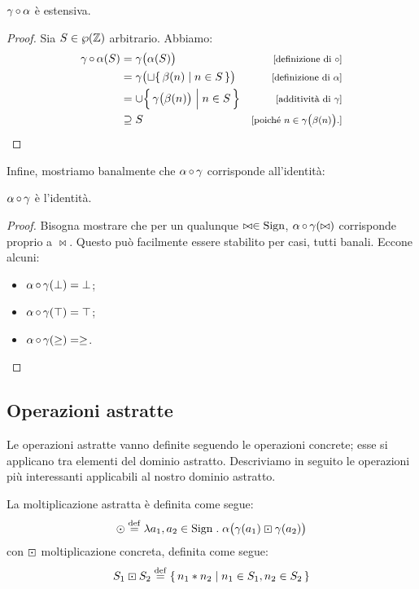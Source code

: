\begin{proposizione}
$\mathrm{\gamma}\mathop{\circ}\mathrm{\alpha}$ è estensiva.
\end{proposizione}
\begin{proof}
Sia $S \in \wp(\mathbb{Z})$ arbitrario.
Abbiamo:
\begin{align*}
  \compfun{\gamma}{\alpha}(S)
    &= \gamma\bigl(\alpha(S)\bigr)
    &\law{definizione di $\circ$} \\
    &= \gamma\bigl(\sqcup \{\, \beta(n) \mid n \in S \,\} \bigr)
    &\law{definizione di $\alpha$} \\
    &= \union \Bigl\{\, \gamma\bigl(\beta(n)\bigr) \Bigm| n \in S \,\Bigr\}
    &\law{additività di $\gamma$} \\
    &\supseteq S
    &\law{poiché $n \in \gamma\bigl(\beta(n)\bigr)$.}
\end{align*}
\end{proof}

Infine, mostriamo banalmente che $\mathrm{\alpha}\mathop{\circ}\mathrm{\gamma}$ corrisponde
all'identità:
\begin{proposizione}
  $\mathrm{\alpha}\mathop{\circ}\mathrm{\gamma}$ è l'identità.
\end{proposizione}
\begin{proof}
Bisogna mostrare che per un qualunque $\bowtie \in \mathrm{Sign}$,
$\mathrm{\alpha}\mathop{\circ}\mathrm{\gamma}(\bowtie)$ corrisponde proprio a $\bowtie$.
Questo può facilmente essere stabilito per casi, tutti banali.
Eccone alcuni:
\begin{itemize}
	\item $\mathrm{\alpha}\mathop{\circ}\mathrm{\gamma}(\bot) = \bot$;
    \item $\mathrm{\alpha}\mathop{\circ}\mathrm{\gamma}(\top) = \top$;
    \item $\mathrm{\alpha}\mathop{\circ}\mathrm{\gamma}(\geq) = \geq$.
\end{itemize}
\end{proof}

\subsection{Operazioni astratte}
Le operazioni astratte vanno definite seguendo le operazioni concrete;
esse si applicano tra elementi del dominio astratto.
Descriviamo in seguito le operazioni più interessanti applicabili
al nostro dominio astratto.

\begin{definizione}
La moltiplicazione astratta è definita come segue:
\[
  \absmul \defeq \lambda a_1,a_2 \in \Sign \st \alpha\bigl(\gamma(a_1) \conmul \gamma(a_2)\bigr)
\]
con $\mathbin{\boxdot}$ moltiplicazione concreta, definita come segue:
\[
  S_1 \conmul S_2 \defeq \{\, n_1 * n_2 \mid n_1 \in S_1, n_2 \in S_2 \,\}
\]
\end{definizione}

